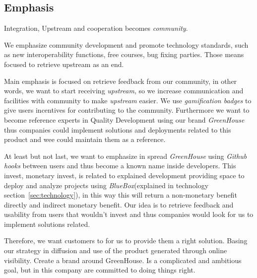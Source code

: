 \documentclass[11pt]{scrartcl}
\begin{document}

\subsection{Emphasis}
\label{sub:emphasis}

\par Integration, Upstream and cooperation becomes \emph{community}.

\par We emphasize community development and promote technology standards, such as new interoperability functions, free courses, bug fixing parties. Those means focused to retrieve upstream as an end.

\par Main emphasis is focused on retrieve feedback from our community, in other words, we want to start receiving \emph{upstream}, so we increase communication and facilities with community to make \emph{upstream} easier. We use \emph{gamification badges} to give users incentives for contributing to the community. Furthermore we want to become reference experts in Quality Development using our brand \emph{GreenHouse} thus companies could implement solutions and deployments related to this product and wee could maintain them as a reference.

\par At least but not last, we want to emphasize in spread \emph{GreenHouse} using \emph{Github hooks} between users and thus become a known name inside developers. This invest, monetary invest, is related to explained development providing space to deploy and analyze projects using \emph{BlueBox}(explained in technology section~\ref{sec:technology}), in this way this will return a non-monetary benefit directly and indirect monetary benefit. Our idea is to retrieve feedback and usability from users that wouldn't invest and thus companies would look for us to implement solutions related.

\par Therefore, we want customers to for us to provide them a right solution. Basing our strategy in diffusion and use of the product generated through online visibility. Create a brand around GreenHouse. Is a complicated and ambitious goal, but in this company are committed to doing things right.


\end{document}

